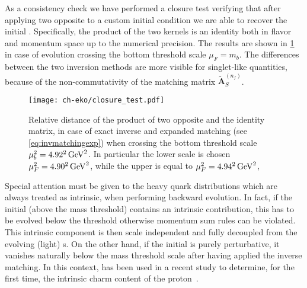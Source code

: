 As a consistency check we have performed a closure test verifying that after
applying two opposite \ekos{} to a custom initial condition
we are able to recover the initial \pdf{}. Specifically, the product of the
two kernels is an identity both in flavor and momentum space up to
the numerical precision. The results are shown in \cref{fig:closure_test} in case of \nnlo{} evolution
crossing the bottom threshold scale $\mu_{F}=m_{b}$. The differences between
the two inversion methods are more visible for singlet-like quantities,
because of the non-commutativity of the matching matrix $\tilde{\mathbf{A}}_{S}^{(n_f)}$.  

\begin{figure}
    \begin{center}
    \texttt{[image: ch-eko/closure\_test.pdf]}
    \end{center}
    \caption{Relative distance of the product of two opposite \nnlo{} \ekos{}
        and the identity matrix, in case of exact inverse and expanded
        matching (see \cref{eq:invmatchingexp}) when crossing the bottom
        threshold scale $\mu_{b}^2=\SI[parse-numbers=false]{4.92^2}{\GeV^2}$. In particular the lower scale is chosen $\muF^2=\SI[parse-numbers=false]{4.90^2}{\GeV^2}$, 
        while the upper is equal to $\muF^2=\SI[parse-numbers=false]{4.94^2}{\GeV^2}$, 
        \label{fig:closure_test}
    }
\end{figure}

Special attention must be given to the heavy quark distributions which are
always treated as intrinsic, when performing backward evolution.
In fact, if the initial \pdf{} (above the mass threshold) contains an intrinsic contribution, this has to be evolved
below the threshold otherwise momentum sum rules can be violated.
This intrinsic component is then scale independent and fully decoupled
from the evolving (light) \pdf{}s.
On the other hand, if the initial \pdf{} is purely perturbative, it vanishes
naturally below the mass threshold scale after having applied the
inverse matching.
In this context, \eko{} has been used in a recent study to determine, for the first time,
the intrinsic charm content of the proton~\cite{Ball:2022qks}.
